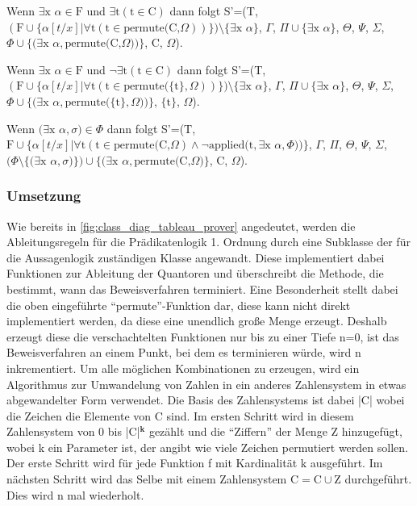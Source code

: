 Wenn $\exists\textrm{x}$ $\alpha\in\textrm{F}$ und $\exists\textrm{t}(\textrm{t}\in\textrm{C})$ dann folgt S'=(T, $(\textrm{F}\cup\lbrace\alpha[t/x]|\forall\textrm{t}(\textrm{t}\in\textrm{permute(C,}\Omega))\rbrace)\setminus\lbrace\exists\textrm{x}$ $\alpha\rbrace$, $\Gamma$, $\Pi\cup\lbrace\exists\textrm{x}$ $\alpha\rbrace$, $\Theta$, $\Psi$, $\Sigma$, $\Phi\cup\lbrace(\exists\textrm{x}$ $\alpha,\textrm{permute(C,}\Omega))\rbrace$, C, $\Omega$).

Wenn $\exists\textrm{x}$ $\alpha\in\textrm{F}$ und $\neg\exists\textrm{t}(\textrm{t}\in\textrm{C})$ dann folgt S'=(T, $(\textrm{F}\cup\lbrace\alpha[t/x]|\forall\textrm{t}(\textrm{t}\in\textrm{permute(}\lbrace\textrm{t}\rbrace,\Omega))\rbrace)\setminus\lbrace\exists\textrm{x}$ $\alpha\rbrace$, $\Gamma$, $\Pi\cup\lbrace\exists\textrm{x}$ $\alpha\rbrace$, $\Theta$, $\Psi$, $\Sigma$, $\Phi\cup\lbrace(\exists\textrm{x}$ $\alpha,\textrm{permute(}\lbrace\textrm{t}\rbrace,\Omega))\rbrace$, $\lbrace\textrm{t}\rbrace$, $\Omega$).

Wenn $(\exists\textrm{x}$ $\alpha, \sigma)\in\Phi$ dann folgt S'=(T, $\textrm{F}\cup\lbrace\alpha[t/x]|\forall\textrm{t}(\textrm{t}\in\textrm{permute(C,}\Omega)\wedge\neg\textrm{applied(t},\exists\textrm{x}$ $\alpha, \Phi))\rbrace$, $\Gamma$, $\Pi$, $\Theta$, $\Psi$, $\Sigma$, $(\Phi\setminus\lbrace(\exists\textrm{x}$ $\alpha, \sigma)\rbrace)\cup\lbrace(\exists\textrm{x}$ $\alpha,\textrm{permute(C,}\Omega)\rbrace$, C, $\Omega$).

\subsubsection{Umsetzung}
Wie bereits in \autoref{fig:class_diag_tableau_prover} angedeutet, werden die Ableitungsregeln für die Prädikatenlogik 1. Ordnung durch eine Subklasse der für die Aussagenlogik zuständigen Klasse angewandt. Diese implementiert dabei Funktionen zur Ableitung der Quantoren und überschreibt die Methode, die bestimmt, wann das Beweisverfahren terminiert. Eine Besonderheit stellt dabei die oben eingeführte ``permute''-Funktion dar, diese kann nicht direkt implementiert werden, da diese eine unendlich große Menge erzeugt. Deshalb erzeugt diese die verschachtelten Funktionen nur bis zu einer Tiefe n=0, ist das Beweisverfahren an einem Punkt, bei dem es terminieren würde, wird n inkrementiert. Um alle möglichen Kombinationen zu erzeugen, wird ein Algorithmus zur Umwandelung von Zahlen in ein anderes Zahlensystem in etwas abgewandelter Form verwendet. Die Basis des Zahlensystems ist dabei |C| wobei die Zeichen die Elemente von C sind. Im ersten Schritt wird in diesem Zahlensystem von 0 bis |C|$^{\textbf{k}}$ gezählt und die ``Ziffern'' der Menge Z hinzugefügt, wobei k ein Parameter ist, der angibt wie viele Zeichen permutiert werden sollen. Der erste Schritt wird für jede Funktion f mit Kardinalität k ausgeführt. Im nächsten Schritt wird das Selbe mit einem Zahlensystem $\textrm{C}=\textrm{C}\cup\textrm{Z}$ durchgeführt. Dies wird n mal wiederholt.


